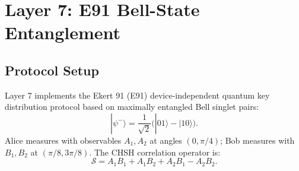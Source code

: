 \documentclass{ieeeaccess}
\newcommand{\calS}{\mathcal{S}}
\begin{document}
\section{Layer 7: E91 Bell-State Entanglement}
\label{sec:L7}

\subsection{Protocol Setup}
Layer 7 implements the Ekert 91 (E91) device-independent quantum key distribution protocol based on maximally entangled Bell singlet pairs:
\begin{equation}
  |\psi^-\rangle = \frac{1}{\sqrt{2}}\Big(|01\rangle - |10\rangle\Big).
\end{equation}
Alice measures with observables $A_1, A_2$ at angles $(0, \pi/4)$; Bob measures with $B_1, B_2$ at $(\pi/8, 3\pi/8)$. The CHSH correlation operator is:
\begin{equation}
  \calS = A_1 B_1 + A_1 B_2 + A_2 B_1 - A_2 B_2.
  \label{eq:chsh-op}
\end{equation}
\end{document}
